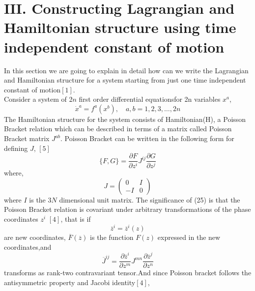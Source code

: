\documentclass[14pt]{extarticle}
\begin{document}
\pagebreak

\section*{{$\mathbf{III}$. Constructing Lagrangian and Hamiltonian structure using time independent constant of motion}}

In this section we are going to explain in detail how can we write the Lagrangian and Hamiltonian structure for a system  starting from just one time independent constant of motion$[1]$.\\
Consider a system of 2$n$ first order differential equationsfor 2n variables $x^{a}$,\\
\begin{equation}
\dot{x}^{a}=f^{a}\left(x^{b}\right), \quad a, b=1,2,3, \ldots, 2 n
\end{equation}
The Hamiltonian structure for the system consists of Hamiltonian(H), a Poisson Bracket relation which can be described in terms of a matrix called Poisson Bracket matrix $J^{a b}$. Poisson Bracket can be written in the following form for defining $J$, $[5]$\\
\begin{equation}
\{F,G\}=\frac{\partial F} {\partial z^{i}} J^{i j}\frac{ \partial G}{\partial z^{j}} 
\end{equation}
where,\\
\begin{equation}
J=\left( \begin{array}{rr}{0} & {I} \\ {-I} & {0}\end{array}\right)
\end{equation}
where $I$ is the 3$N$ dimensional unit matrix. The significance of (25) is that the Poisson Bracket relation is covariant under arbitrary transformations of the phase coordinates $z^{i}$ $[4]$, that is if\\
\begin{equation}
\overline{z}^{i}=\overline{z}^{i}(z)
\end{equation}
are new coordinates, $\overline{F}(\overline{z})$ is the function $F(z)$ expressed in the new coordinates,and\\
\begin{equation}
\overline{J}^{i j}=\frac{\partial \overline{z}^{i}}{\partial z^{m}}{J}^{m n}\frac{\partial \overline{z}^{j}}{\partial z^{n}}
\end{equation}
transforms as rank-two contravariant tensor.And since Poisson bracket follows the antisymmetric property and Jacobi identity$[4]$,\\
\end{document}
